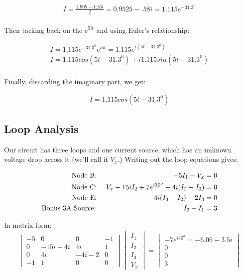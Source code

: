 \documentclass{book}
\numberwithin{equation}{section}
\theoremstyle{definition}
\begin{document}
\begin{align*}
I=\frac{1.905-1.16i}{2}=0.9525-.58i=1.115e^{-31.3^0}\\
\end{align*}

Then tacking back on the $e^{5it}$ and using Euler's relationship:

\begin{align*}
I = 1.115e^{-31.3^0}e^{i5t}=1.115e^{i(5t-31.3^0)}\\
I=1.115cos(5t-31.3^0)+i1.115sin(5t-31.3^0)\\
\end{align*}

Finally, discarding the imaginary part, we get:

\begin{align*}
I=1.115cos(5t-31.3^0)
\end{align*}

\subsection{Loop Analysis}
Our circuit has three loops and one current source, which has an unknown voltage drop across it (we'll call it $V_x$.) Writing out the loop equations gives:

\begin{align}
\text{Node B: }&&-5I_1-V_x&=0 \notag\\
\text{Node C: }&&V_x-15iI_2+7e^{i30^o}-4i(I_2-I_3)&=0\notag\\
\text{Node E: }&&-4i(I_3-I_2)-2I_3&=0\notag\\
\text{Bonus 3A Source: }&&I_2-I_1&=3
\end{align}

In matrix form:
\begin{align}
\begin{vmatrix}
-5		&0		&0	&-1\\
0		&-15i-4i	&4i	&1\\
0		&4i		&-4i-2 	&0\\
-1		&1		&0	&0
\end{vmatrix}
\begin{vmatrix}I_1\\I_2\\I_3\\V_x\end{vmatrix} =
\begin{vmatrix}-7e^{i30^o}=-6.06-3.5i\\0\\0\\3\end{vmatrix}
\end{align}
\end{document}
